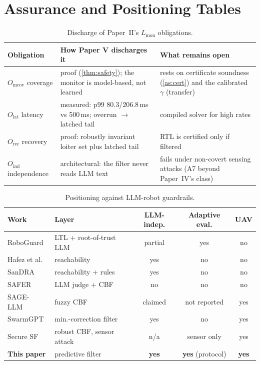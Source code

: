 \section{Assurance and Positioning Tables}\label{app:tables}
\begin{table}[h]
\centering\scriptsize
\caption{Discharge of Paper~II's $L_{\mathrm{mon}}$ obligations.}
\label{tab:lmon}
\setlength{\tabcolsep}{2.5pt}
\begin{tabularx}{\columnwidth}{@{}l>{\raggedright\arraybackslash}X>{\raggedright\arraybackslash}X@{}}
\toprule
Obligation & How Paper V discharges it & What remains open \\
\midrule
$O_{\mathrm{mcov}}$ coverage & proof (\cref{thm:safety}); the monitor is model-based, not learned & rests on certificate soundness (\cref{as:cert}) and the calibrated $\gamma$ (transfer) \\
$O_{\mathrm{lat}}$ latency & measured: p99 80.3/206.8\,ms vs 500\,ms; overrun $\to$ latched tail & compiled solver for high rates \\
$O_{\mathrm{rec}}$ recovery & proof: robustly invariant loiter set plus latched tail & RTL is certified only if filtered \\
$O_{\mathrm{ind}}$ independence & architectural: the filter never reads LLM text & fails under non-covert sensing attacks (A7 beyond Paper~IV's class) \\
\bottomrule
\end{tabularx}
\end{table}
\begin{table}[h]
\centering\scriptsize
\caption{Positioning against LLM-robot guardrails.}
\label{tab:related}
\setlength{\tabcolsep}{2.5pt}
\begin{tabular}{@{}llccc@{}}
\toprule
Work & Layer & LLM-indep. & Adaptive eval. & UAV\\
\midrule
RoboGuard~\cite{ravichandran2026roboguard} & LTL + root-of-trust LLM & partial & yes & no\\
Hafez et al.~\cite{hafez2025reachllm} & reachability & yes & no & no\\
SanDRA~\cite{lin2025sandra} & reachability + rules & yes & no & no\\
SAFER~\cite{khan2025safer} & LLM judge + CBF & no & no & no\\
SAGE-LLM~\cite{zhao2026sagellm} & fuzzy CBF & claimed & not reported & yes\\
SwarmGPT~\cite{schuck2025swarmgpt} & min.-correction filter & yes & no & yes\\
Secure SF~\cite{tan2025securesf} & robust CBF, sensor attack & n/a & sensor only & yes\\
\textbf{This paper} & predictive filter & \textbf{yes} & \textbf{yes} (protocol) & \textbf{yes}\\
\bottomrule
\end{tabular}
\end{table}

